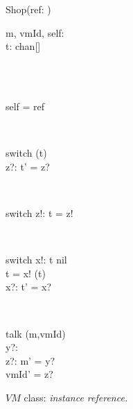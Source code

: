\begin{figure}[H]
\centering
\begin{class}{Shop(ref: \integer)}
\\
\begin{state}
m, vmId, self: \integer
\\t: chan[\integer \times \integer]
\end{state} 
\\
\begin{init}
\\self = ref
\end{init} 
\\
\begin{op}{switch}
\Delta (t)
\\z?: \integer
\ST
t' = z?
\end{op}
\\
\begin{op}{switch}
z!: \integer
\ST
t = z!
\end{op}
\\
\begin{op}{switch}
x!: \integer
\ST
t \neq nil
\\t = x!
\ST
\ST
\Delta (t)
\\x?: \integer
\ST
t' = x?
\end{op}
\\
\begin{op}{talk}
\Delta (m,vmId)
\\y?: \integer
\\z?: \integer
\ST
m' = y?
\\vmId' = z?
\end{op}
\end{class}
\caption{$VM$ class: \textit{instance reference.}}
\label{oz_unfixed_operation_shop}
\end{figure}